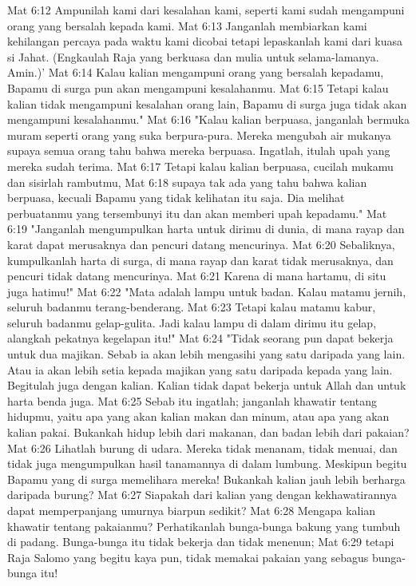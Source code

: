 Mat 6:12  Ampunilah kami dari kesalahan kami, seperti kami sudah mengampuni orang yang bersalah kepada kami.
Mat 6:13  Janganlah membiarkan kami kehilangan percaya pada waktu kami dicobai tetapi lepaskanlah kami dari kuasa si Jahat. (Engkaulah Raja yang berkuasa dan mulia untuk selama-lamanya. Amin.)'
Mat 6:14  Kalau kalian mengampuni orang yang bersalah kepadamu, Bapamu di surga pun akan mengampuni kesalahanmu.
Mat 6:15  Tetapi kalau kalian tidak mengampuni kesalahan orang lain, Bapamu di surga juga tidak akan mengampuni kesalahanmu."
Mat 6:16  "Kalau kalian berpuasa, janganlah bermuka muram seperti orang yang suka berpura-pura. Mereka mengubah air mukanya supaya semua orang tahu bahwa mereka berpuasa. Ingatlah, itulah upah yang mereka sudah terima.
Mat 6:17  Tetapi kalau kalian berpuasa, cucilah mukamu dan sisirlah rambutmu,
Mat 6:18  supaya tak ada yang tahu bahwa kalian berpuasa, kecuali Bapamu yang tidak kelihatan itu saja. Dia melihat perbuatanmu yang tersembunyi itu dan akan memberi upah kepadamu."
Mat 6:19  "Janganlah mengumpulkan harta untuk dirimu di dunia, di mana rayap dan karat dapat merusaknya dan pencuri datang mencurinya.
Mat 6:20  Sebaliknya, kumpulkanlah harta di surga, di mana rayap dan karat tidak merusaknya, dan pencuri tidak datang mencurinya.
Mat 6:21  Karena di mana hartamu, di situ juga hatimu!"
Mat 6:22  "Mata adalah lampu untuk badan. Kalau matamu jernih, seluruh badanmu terang-benderang.
Mat 6:23  Tetapi kalau matamu kabur, seluruh badanmu gelap-gulita. Jadi kalau lampu di dalam dirimu itu gelap, alangkah pekatnya kegelapan itu!"
Mat 6:24  "Tidak seorang pun dapat bekerja untuk dua majikan. Sebab ia akan lebih mengasihi yang satu daripada yang lain. Atau ia akan lebih setia kepada majikan yang satu daripada kepada yang lain. Begitulah juga dengan kalian. Kalian tidak dapat bekerja untuk Allah dan untuk harta benda juga.
Mat 6:25  Sebab itu ingatlah; janganlah khawatir tentang hidupmu, yaitu apa yang akan kalian makan dan minum, atau apa yang akan kalian pakai. Bukankah hidup lebih dari makanan, dan badan lebih dari pakaian?
Mat 6:26  Lihatlah burung di udara. Mereka tidak menanam, tidak menuai, dan tidak juga mengumpulkan hasil tanamannya di dalam lumbung. Meskipun begitu Bapamu yang di surga memelihara mereka! Bukankah kalian jauh lebih berharga daripada burung?
Mat 6:27  Siapakah dari kalian yang dengan kekhawatirannya dapat memperpanjang umurnya biarpun sedikit?
Mat 6:28  Mengapa kalian khawatir tentang pakaianmu? Perhatikanlah bunga-bunga bakung yang tumbuh di padang. Bunga-bunga itu tidak bekerja dan tidak menenun;
Mat 6:29  tetapi Raja Salomo yang begitu kaya pun, tidak memakai pakaian yang sebagus bunga-bunga itu!
